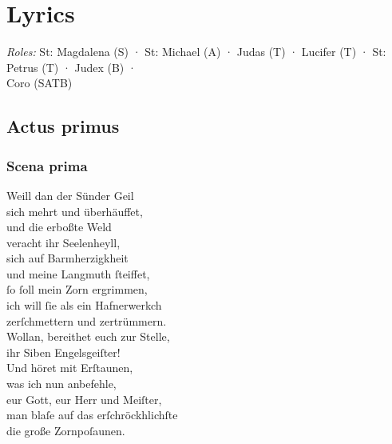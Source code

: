\documentclass{ees}
\newenvironment{lyrics}[1]{%
  \subsection{#1}\nopagebreak%
  \begin{lyricslist}%
  \let\voice\item%
}{%
  \end{lyricslist}%
}
\begin{document}
\clearscrheadfoot

\chapter{Lyrics}

\textit{Roles:} St: Magdalena (S) · St: Michael (A) · Judas (T) · Lucifer (T) · St: Petrus (T) · Judex (B) · \\Coro (SATB)

\section{Actus primus}

\begin{lyrics}{Scena prima}
  \voice[Judex]
  Weill dan der Sünder Geil\\
  sich mehrt und überhäuffet,\\
  und die erboßte Weld\\
  veracht ihr Seelenheyll,\\
  sich auf Barmherzigkheit\\
  und meine Langmuth ſteiffet,\\
  ſo ſoll mein Zorn ergrimmen,\\
  ich will ſie als ein Hafnerwerkch\\
  zerſchmettern und zertrümmern.\\
  Wollan, bereithet euch zur Stelle,\\
  ihr Siben Engelsgeiſter!\\
  Und höret mit Erſtaunen,\\
  was ich nun anbefehle,\\
  eur Gott, eur Herr und Meiſter,\\
  man blaſe auf das erſchröckhlichſte\\
  die große Zornpoſaunen.
\end{lyrics}
\end{document}
